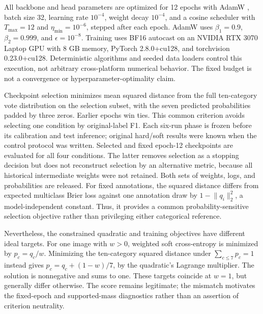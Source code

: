 \documentclass[pdflatex,sn-mathphys-num]{sn-jnl}
\begin{document}
All backbone and head parameters are optimized for 12 epochs with AdamW \cite{loshchilov2019adamw}, batch size 32, learning rate $10^{-4}$, weight decay $10^{-4}$, and a cosine scheduler with $T_{\max}=12$ and $\eta_{\min}=10^{-6}$, stepped after each epoch. AdamW uses $\beta_1=0.9$, $\beta_2=0.999$, and $\epsilon=10^{-8}$. Training uses BF16 autocast on an NVIDIA RTX 3070 Laptop GPU with 8 GB memory, PyTorch 2.8.0+cu128, and torchvision 0.23.0+cu128. Deterministic algorithms and seeded data loaders control this execution, not arbitrary cross-platform numerical behavior. The fixed budget is not a convergence or hyperparameter-optimality claim.

Checkpoint selection minimizes mean squared distance from the full ten-category vote distribution on the selection subset, with the seven predicted probabilities padded by three zeros. Earlier epochs win ties. This common criterion avoids selecting one condition by original-label F1. Each six-run phase is frozen before its calibration and test inference; original hard/soft results were known when the control protocol was written. Selected and fixed epoch-12 checkpoints are evaluated for all four conditions. The latter removes selection as a stopping decision but does not reconstruct selection by an alternative metric, because all historical intermediate weights were not retained. Both sets of weights, logs, and probabilities are released.
For fixed annotations, the squared distance differs from expected multiclass Brier loss against one annotation draw by $1-\lVert q_i\rVert_2^2$, a model-independent constant. Thus, it provides a common probability-sensitive selection objective rather than privileging either categorical reference.

Nevertheless, the constrained quadratic and training objectives have different ideal targets. For one image with $w>0$, weighted soft cross-entropy is minimized by $p_c=q_c/w$. Minimizing the ten-category squared distance under $\sum_{c\leq7}p_c=1$ instead gives $p_c=q_c+(1-w)/7$, by the quadratic's Lagrange multiplier. The solution is nonnegative and sums to one. These targets coincide at $w=1$, but generally differ otherwise. The score remains legitimate; the mismatch motivates the fixed-epoch and supported-mass diagnostics rather than an assertion of criterion neutrality.
\end{document}
